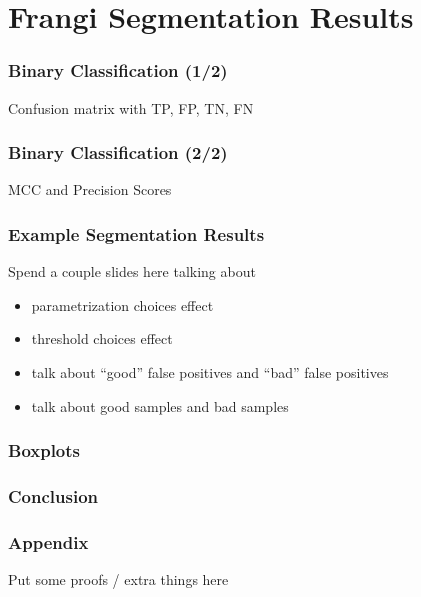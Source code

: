 \documentclass[9pt,notes]{beamer}
\begin{document}
\section{Frangi Segmentation Results}
\begin{frame}
\frametitle{Binary Classification (1/2)}
Confusion matrix with TP, FP, TN, FN
\end{frame}

\begin{frame}
\frametitle{Binary Classification (2/2)}
MCC and Precision Scores
\end{frame}

\begin{frame}
\frametitle{Example Segmentation Results}
Spend a couple slides here talking about
\begin{itemize}
  \item parametrization choices effect
  \item threshold choices effect
  \item talk about ``good'' false positives and  ``bad'' false positives
  \item talk about good samples and bad samples
\end{itemize}
\end{frame}

\begin{frame}
\frametitle{Boxplots}
\end{frame}

\begin{frame}
\frametitle{Conclusion}
\end{frame}

\begin{frame}
\frametitle{Appendix}
Put some proofs / extra things here
\end{frame}
\end{document}
